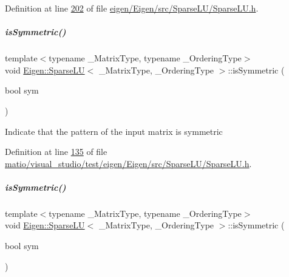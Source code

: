 Definition at line \hyperlink{eigen_2_eigen_2src_2_sparse_l_u_2_sparse_l_u_8h_source_l00202}{202} of file \hyperlink{eigen_2_eigen_2src_2_sparse_l_u_2_sparse_l_u_8h_source}{eigen/\+Eigen/src/\+Sparse\+L\+U/\+Sparse\+L\+U.\+h}.

\mbox{\label{group___sparse_l_u___module_afff3bd506cd78172e5219c707562729f}} 
\subparagraph{\texorpdfstring{is\+Symmetric()}{isSymmetric()}\hspace{0.1cm}{\footnotesize\ttfamily [1/2]}}
{\footnotesize\ttfamily template$<$typename \+\_\+\+Matrix\+Type, typename \+\_\+\+Ordering\+Type$>$ \\
void \hyperlink{group___sparse_l_u___module_class_eigen_1_1_sparse_l_u}{Eigen\+::\+Sparse\+LU}$<$ \+\_\+\+Matrix\+Type, \+\_\+\+Ordering\+Type $>$\+::is\+Symmetric (\begin{DoxyParamCaption}\item[{bool}]{sym }\end{DoxyParamCaption})\hspace{0.3cm}{\ttfamily [inline]}}

Indicate that the pattern of the input matrix is symmetric 

Definition at line \hyperlink{matio_2visual__studio_2test_2eigen_2_eigen_2src_2_sparse_l_u_2_sparse_l_u_8h_source_l00135}{135} of file \hyperlink{matio_2visual__studio_2test_2eigen_2_eigen_2src_2_sparse_l_u_2_sparse_l_u_8h_source}{matio/visual\+\_\+studio/test/eigen/\+Eigen/src/\+Sparse\+L\+U/\+Sparse\+L\+U.\+h}.

\mbox{\label{group___sparse_l_u___module_afff3bd506cd78172e5219c707562729f}} 
\subparagraph{\texorpdfstring{is\+Symmetric()}{isSymmetric()}\hspace{0.1cm}{\footnotesize\ttfamily [2/2]}}
{\footnotesize\ttfamily template$<$typename \+\_\+\+Matrix\+Type, typename \+\_\+\+Ordering\+Type$>$ \\
void \hyperlink{group___sparse_l_u___module_class_eigen_1_1_sparse_l_u}{Eigen\+::\+Sparse\+LU}$<$ \+\_\+\+Matrix\+Type, \+\_\+\+Ordering\+Type $>$\+::is\+Symmetric (\begin{DoxyParamCaption}\item[{bool}]{sym }\end{DoxyParamCaption})\hspace{0.3cm}{\ttfamily [inline]}}

